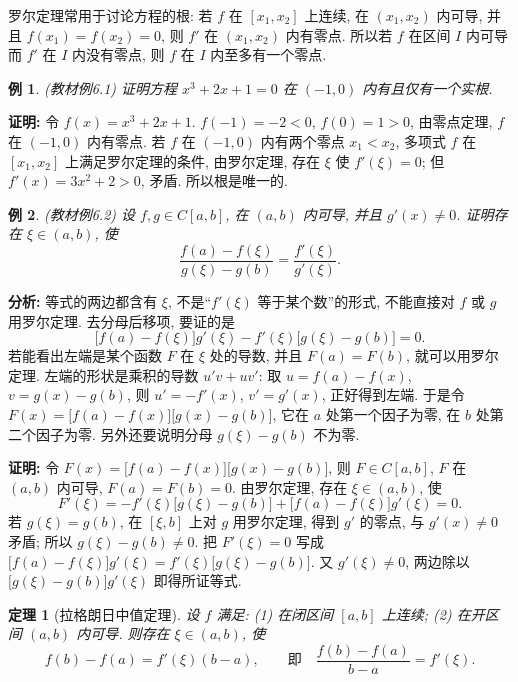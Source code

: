 \documentclass[UTF8,openany]{ctexbook}
\theoremstyle{chinesetextbook}
\newtheorem{example}{例}[section]
\newtheorem{theorem}{定理}[section]
\newenvironment{cnproof}{\par\indent\textbf{证明:} \ignorespaces}{\par}
\begin{document}
罗尔定理常用于讨论方程的根: 若 $f$ 在 $[x_1,x_2]$ 上连续, 在 $(x_1,x_2)$ 内可导, 并且 $f(x_1)=f(x_2)=0$, 则 $f'$ 在 $(x_1,x_2)$ 内有零点. 所以若 $f$ 在区间 $I$ 内可导而 $f'$ 在 $I$ 内没有零点, 则 $f$ 在 $I$ 内至多有一个零点.
\begin{example}\label{ex:c2-6-1}
\textnormal{(教材例6.1)} 证明方程 $x^3+2x+1=0$ 在 $(-1,0)$ 内有且仅有一个实根.
\end{example}
\begin{cnproof}
令 $f(x)=x^3+2x+1$. $f(-1)=-2<0$, $f(0)=1>0$, 由零点定理, $f$ 在 $(-1,0)$ 内有零点. 若 $f$ 在 $(-1,0)$ 内有两个零点 $x_1<x_2$, 多项式 $f$ 在 $[x_1,x_2]$ 上满足罗尔定理的条件, 由罗尔定理, 存在 $\xi$ 使 $f'(\xi)=0$; 但 $f'(x)=3x^2+2>0$, 矛盾. 所以根是唯一的.
\end{cnproof}
\begin{example}\label{ex:c2-6-2}
\textnormal{(教材例6.2)} 设 $f,g\in C[a,b]$, 在 $(a,b)$ 内可导, 并且 $g'(x)\ne0$. 证明存在 $\xi\in(a,b)$, 使
\[
\frac{f(a)-f(\xi)}{g(\xi)-g(b)}=\frac{f'(\xi)}{g'(\xi)}.
\]
\end{example}
\par\indent\textbf{分析:} 等式的两边都含有 $\xi$, 不是“$f'(\xi)$ 等于某个数”的形式, 不能直接对 $f$ 或 $g$ 用罗尔定理. 去分母后移项, 要证的是
\[
\bigl[f(a)-f(\xi)\bigr]g'(\xi)-f'(\xi)\bigl[g(\xi)-g(b)\bigr]=0.
\]
若能看出左端是某个函数 $F$ 在 $\xi$ 处的导数, 并且 $F(a)=F(b)$, 就可以用罗尔定理. 左端的形状是乘积的导数 $u'v+uv'$: 取 $u=f(a)-f(x)$, $v=g(x)-g(b)$, 则 $u'=-f'(x)$, $v'=g'(x)$, 正好得到左端. 于是令 $F(x)=\bigl[f(a)-f(x)\bigr]\bigl[g(x)-g(b)\bigr]$, 它在 $a$ 处第一个因子为零, 在 $b$ 处第二个因子为零. 另外还要说明分母 $g(\xi)-g(b)$ 不为零.
\begin{cnproof}
令 $F(x)=\bigl[f(a)-f(x)\bigr]\bigl[g(x)-g(b)\bigr]$, 则 $F\in C[a,b]$, $F$ 在 $(a,b)$ 内可导, $F(a)=F(b)=0$. 由罗尔定理, 存在 $\xi\in(a,b)$, 使
\[
F'(\xi)=-f'(\xi)\bigl[g(\xi)-g(b)\bigr]+\bigl[f(a)-f(\xi)\bigr]g'(\xi)=0.
\]
若 $g(\xi)=g(b)$, 在 $[\xi,b]$ 上对 $g$ 用罗尔定理, 得到 $g'$ 的零点, 与 $g'(x)\ne0$ 矛盾; 所以 $g(\xi)-g(b)\ne0$. 把 $F'(\xi)=0$ 写成 $\bigl[f(a)-f(\xi)\bigr]g'(\xi)=f'(\xi)\bigl[g(\xi)-g(b)\bigr]$. 又 $g'(\xi)\ne0$, 两边除以 $\bigl[g(\xi)-g(b)\bigr]g'(\xi)$ 即得所证等式.
\end{cnproof}
\begin{theorem}[拉格朗日中值定理]\label{thm:c2-6-lagrange}
设 $f$ 满足: (1) 在闭区间 $[a,b]$ 上连续; (2) 在开区间 $(a,b)$ 内可导. 则存在 $\xi\in(a,b)$, 使
\[
f(b)-f(a)=f'(\xi)(b-a),\qquad\text{即}\quad\frac{f(b)-f(a)}{b-a}=f'(\xi).
\]
\end{theorem}
\end{document}
